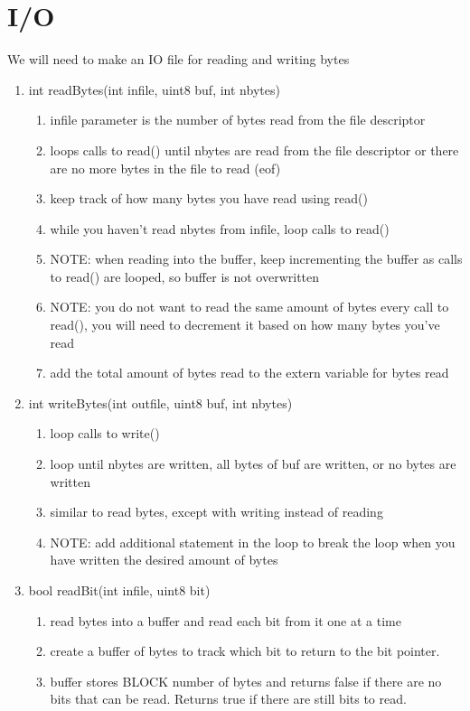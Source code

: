 \documentclass[11pt]{article}
\begin{document}
\section{I/O}\label{ss:IO}
We will need to make an IO file for reading and writing bytes
\begin{enumerate}
\item int readBytes(int infile, uint8 buf, int nbytes)
	\begin{enumerate}
	\item infile parameter is the number of bytes read from the file descriptor
	\item loops calls to read() until nbytes are read from the file descriptor or there are no more bytes in the file to read (eof)
	\item keep track of how many bytes you have read using read()
	\item while you haven't read nbytes from infile, loop calls to read()
	\item NOTE: when reading into the buffer, keep incrementing the buffer as calls to read() are looped, so buffer is not overwritten
	\item NOTE: you do not want to read the same amount of bytes every call to read(), you will need to decrement it based on how many bytes you've read
	\item add the total amount of bytes read to the extern variable for bytes read
	\end{enumerate}
\item int writeBytes(int outfile, uint8 buf, int nbytes)
	\begin{enumerate}
	\item loop calls to write()
	\item loop until nbytes are written, all bytes of buf are written, or no bytes are written
	\item similar to read bytes, except with writing instead of reading
	\item NOTE: add additional statement in the loop to break the loop when you have written the desired amount of bytes
	\end{enumerate}
\item bool readBit(int infile, uint8 bit)
	\begin{enumerate}
	\item read bytes into a buffer and read each bit from it one at a time
	\item create a buffer of bytes to track which bit to return to the bit pointer.
	\item buffer stores BLOCK number of bytes and returns false if there are no bits that can be read. Returns true if there are still bits to read.

\end{enumerate}
\end{enumerate}
\end{document}
